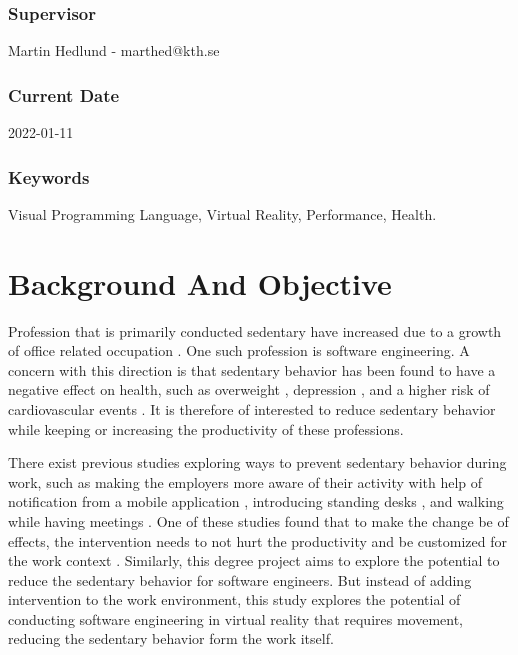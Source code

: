 \documentclass{sigchi}
\begin{document}
\subsubsection{Supervisor} 
Martin Hedlund - marthed@kth.se

\subsubsection{Current Date} 
2022-01-11

\subsubsection{Keywords} 
Visual Programming Language, Virtual Reality, Performance, Health.

\section{Background And Objective}
% 

Profession that is primarily conducted sedentary have increased due to a growth of office related occupation \cite{parry_contribution_2013}. One such profession is software engineering. A concern with this direction is that sedentary behavior has been found to have a negative effect on health, such as overweight \cite{lakdawalla_labor_2007}, depression \cite{zhai_sedentary_2015}, and a higher risk of cardiovascular events \cite{straker_sedentary_2016}. It is therefore of interested to reduce sedentary behavior while keeping or increasing the productivity of these professions.

There exist previous studies exploring ways to prevent sedentary behavior during work, such as making the employers more aware of their activity with help of notification from a mobile application \cite{cole_they_2015}, introducing standing desks \cite{pronk_reducing_2012}, and walking while having meetings \cite{bort-roig_uptake_2014}. One of these studies found that to make the change be of effects, the intervention needs to not hurt the productivity and be customized for the work context \cite{bort-roig_uptake_2014}. Similarly, this degree project aims to explore the potential to reduce the sedentary behavior for software engineers. But instead of adding intervention to the work environment, this study explores the potential of conducting software engineering in virtual reality that requires movement, reducing the sedentary behavior form the work itself.
\end{document}
